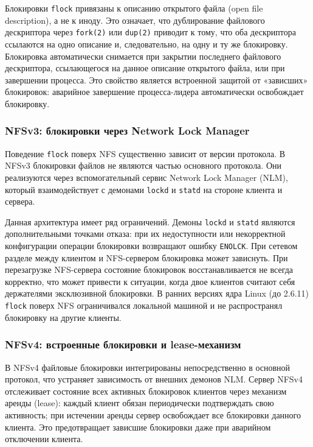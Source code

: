 Блокировки \texttt{flock} привязаны к описанию открытого файла (open file description), а не к иноду. Это означает, что дублирование файлового дескриптора через \texttt{fork(2)} или \texttt{dup(2)} приводит к тому, что оба дескриптора ссылаются на одно описание и, следовательно, на одну и ту же блокировку. Блокировка автоматически снимается при закрытии последнего файлового дескриптора, ссылающегося на данное описание открытого файла, или при завершении процесса. Это свойство является встроенной защитой от «зависших» блокировок: аварийное завершение процесса-лидера автоматически освобождает блокировку.

\subsubsection*{NFSv3: блокировки через Network Lock Manager}

Поведение \texttt{flock} поверх NFS существенно зависит от версии протокола. В NFSv3 блокировки файлов не являются частью основного протокола. Они реализуются через вспомогательный сервис Network Lock Manager (NLM), который взаимодействует с демонами \texttt{lockd} и \texttt{statd} на стороне клиента и сервера.

Данная архитектура имеет ряд ограничений. Демоны \texttt{lockd} и \texttt{statd} являются дополнительными точками отказа: при их недоступности или некорректной конфигурации операции блокировки возвращают ошибку \texttt{ENOLCK}. При сетевом разделе между клиентом и NFS-сервером блокировка может зависнуть. При перезагрузке NFS-сервера состояние блокировок восстанавливается не всегда корректно, что может привести к ситуации, когда двое клиентов считают себя держателями эксклюзивной блокировки. В ранних версиях ядра Linux (до 2.6.11) \texttt{flock} поверх NFS ограничивался локальной машиной и не распространял блокировку на другие клиенты.

\subsubsection*{NFSv4: встроенные блокировки и lease-механизм}

В NFSv4 файловые блокировки интегрированы непосредственно в основной протокол, что устраняет зависимость от внешних демонов NLM. Сервер NFSv4 отслеживает состояние всех активных блокировок клиентов через механизм аренды (lease): каждый клиент обязан периодически подтверждать свою активность; при истечении аренды сервер освобождает все блокировки данного клиента. Это предотвращает зависшие блокировки даже при аварийном отключении клиента.

